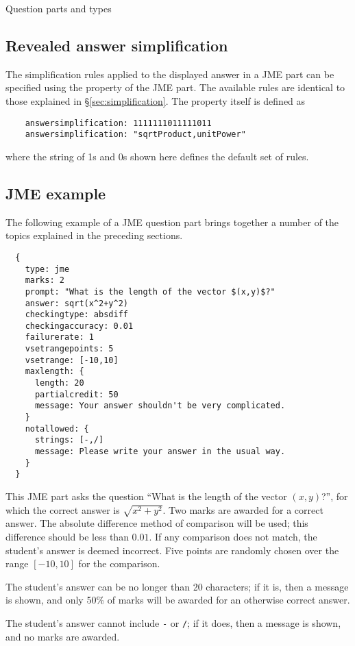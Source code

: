 \begin{chapter}{\label{cha:question_parts}Question parts and types}
  \subsection{\label{sec:answer_simplification}Revealed answer simplification}
  The simplification rules applied to the displayed answer in a JME part can be
  specified using the  property of the JME part.
  The available rules are identical to those explained in
  \S\ref{sec:simplification}.  The property itself is defined as
  \begin{Verbatim}
    answersimplification: 1111111011111011
    answersimplification: "sqrtProduct,unitPower"
  \end{Verbatim}
  where the string of 1s and 0s shown here defines the default set of rules.

  \subsection{JME example}
  The following example of a JME question part brings together a number of the
  topics explained in the preceding sections.
  \begin{Verbatim}
  {
    type: jme
    marks: 2
    prompt: "What is the length of the vector $(x,y)$?"
    answer: sqrt(x^2+y^2)
    checkingtype: absdiff
    checkingaccuracy: 0.01
    failurerate: 1
    vsetrangepoints: 5
    vsetrange: [-10,10]
    maxlength: {
      length: 20
      partialcredit: 50
      message: Your answer shouldn't be very complicated.
    }
    notallowed: {
      strings: [-,/]
      message: Please write your answer in the usual way.
    }
  }
  \end{Verbatim}
  This JME part asks the question ``What is the length of the vector
  $(x,y)$?'', for which the correct answer is $\sqrt{x^{2}+y^{2}}$.  Two marks
  are awarded for a correct answer.  The absolute difference method of
  comparison will be used; this difference should be less than $0.01$.  If any
  comparison does not match, the student's answer is deemed incorrect.  Five
  points are randomly chosen over the range $[-10,10]$ for the comparison.

  The student's answer can be no longer than 20 characters; if it is, then a
  message is shown, and only 50\% of marks will be awarded for an otherwise
  correct answer.

  The student's answer cannot include \verb"-" or \verb"/"; if it does, then a
  message is shown, and no marks are awarded.


\end{chapter}
